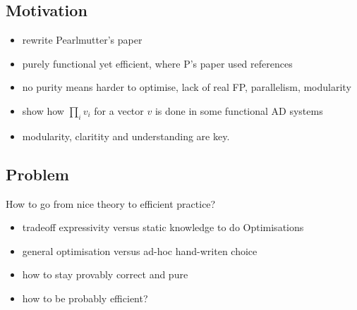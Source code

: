 
\subsection{Motivation}

\begin{itemize}
    \item rewrite Pearlmutter's paper
    \item purely functional yet efficient, where P's paper used references
    \item no purity means harder to optimise, lack of real FP, parallelism, modularity
    \item show how $\prod_i v_i$ for a vector $v$ is done in some functional AD systems
    \item modularity, claritity and understanding are key.
\end{itemize} 

\subsection{Problem}

How to go from nice theory to efficient practice?
\begin{itemize}
    \item tradeoff expressivity versus static knowledge to do Optimisations
    \item general optimisation versus ad-hoc hand-writen choice
    \item how to stay provably correct and pure
    \item how to be probably efficient?
\end{itemize}

